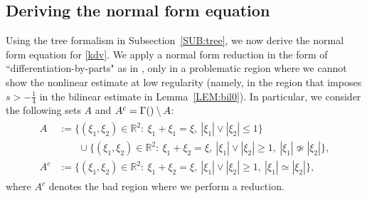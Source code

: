 \documentclass[%
11pt,  reqno]{amsart}
\makeatletter
\newcommand{\5}{\textup{V}}
\newcommand{\noi}{\noindent}
\newtheorem{example}{Example}
\theoremstyle{remark}
\newcommand{\R}{\mathbb{R}}
\newcommand{\TT}{\mathcal{T}}
\newcommand{\G}{\Gamma}
\def\<#1>{\csname MH@symb@#1\endcsname}
\def\distC{15}
\newcommand{\cherry}[3]{
	\begin{tikzpicture}[
		baseline=-8, scale=0.6, every node/.style={dotA},
		level distance=15pt,
		level 1/.style={sibling distance=\distC pt}
		]
		\node  [label=above:{$#1$}]  (root) {}
		child
		child
		;
		\node [label= left:{$#2$}]  at (root-1) {};
		\node [label= right:{$#3$}] at (root-2) {};
	\end{tikzpicture}
}
\numberwithin{equation}{section}
\numberwithin{theorem}{section}
\makeatother
\begin{document}
%
%
%
%




\subsection{Deriving the normal form equation}

Using the tree formalism in Subsection~\ref{SUB:tree}, we now derive the normal form equation for \eqref{kdv}.
We apply a normal form reduction in the form of ``differentiation-by-parts" as in \cite{bit}, only in a problematic region where we cannot show the nonlinear estimate at low regularity
(namely, in the region that imposes $s>-\frac14$ in the bilinear estimate in Lemma~\ref{LEM:bil0}).
In particular, we consider the following sets $A$ and $A^c = \G({\<1>}) \setminus A$: 
\begin{align}
\label{A}
\begin{split} 
A & := \big\{ (\xi_{1}, \xi_{2}) \in \R^2: \ \xi_{1}+ \xi_{1} = \xi, \  |\xi_{1}| \lor  |\xi_{2}| \le 1  \big\} \\
& \qquad
\cup \big\{ (\xi_{1}, \xi_{2})\in \R^2: \ \xi_{1} + \xi_{2} = \xi, \ |\xi_{1}| \lor  |\xi_{2}| \ge 1,  \ |\xi_{1}| \not\simeq |\xi_{2}| \big\}, \\
A^c & := \big\{ (\xi_{1}, \xi_2) \in \R^2: \ \xi_{1}+ \xi_{2} = \xi,  \ |\xi_{1}| \lor |\xi_{2}| \ge 1 , \ |\xi_{1}| \simeq |\xi_{2}| \big\}, 
\end{split}
\end{align}
where $A^c$ denotes the bad region where we perform a reduction. 
\end{document}
